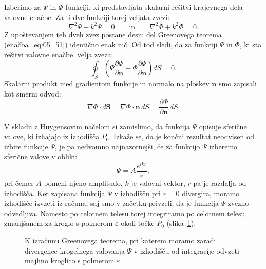 Izberimo za $\Psi$ in $\Phi$ funkciji, ki predstavljata skalarni rešitvi
krajevnega dela valovne enačbe. Za ti dve funkciji torej veljata zvezi:
\begin{equation}
\nabla^2 \Psi + k^2 \Psi = 0 \qquad \mathrm{in} \qquad \nabla^2 \Phi + k^2 \Phi = 0.
\label{eq:05_52}
\end{equation}
Z upoštevanjem teh dveh zvez postane desni del Greenovega teorema 
(enačba~\ref{eq:05_51}) identično enak nič. Od tod sledi, da za funkciji $\Psi$ in $\Phi$,
ki sta rešitvi valovne enačbe, velja zveza:
\begin{equation}
\oint_S \left( \Psi\frac{\partial \Phi}{\partial \mathbf{n}} -
\Phi\frac{\partial \Psi}{\partial \mathbf{n}} \right) dS = 0.
\label{eq:05_53}
\end{equation}
Skalarni produkt med gradientom funkcije in normalo na ploskev $\mathbf{n}$ smo
zapisali kot smerni odvod:
\begin{equation}
\nabla\Phi \cdot d\mathbf{S} = \nabla \Phi \cdot \mathbf{n}\,dS = 
\frac{\partial \Phi}{\partial \mathbf{n}}\,dS.
\label{eq:05_53a}
\end{equation}

V skladu z Huygensovim  načelom si zamislimo, da funkcija $\Psi$ opisuje sferične valove, ki
izhajajo iz izhodišča $P_0$. Izkaže se, da je končni rezultat neodvisen od izbire
funkcije $\Psi$, je pa nedvomno najnazornejši, če za funkcijo $\Psi$ 
izberemo sferične valove v obliki:
\begin{equation}
\Psi = A \frac{e^{ikr}}{r},
\label{eq:05_54}
\end{equation}
pri čemer $A$ pomeni njeno amplitudo, $k$ je valovni vektor, $r$ pa je 
razdalja od izhodišča. Ker zapisana funkcija $\Psi$ 
v izhodišču pri $r=0$ divergira, moramo izhodišče
izvzeti iz računa, saj smo v začetku privzeli, da je funkcija $\Psi$
zvezno odvedljiva. Namesto po celotnem telesu torej integriramo 
po celotnem telesu, zmanjšanem za kroglo s 
polmerom $\varepsilon$ okoli točke $P_0$ (slika~\ref{fig:05_Green}).
\begin{figure}[ht]
\centering
\def\svgwidth{70truemm} 

\caption{K izračunu Greenovega teorema, pri katerem moramo zaradi divergence krogelnega
valovanja $\Psi$ v izhodišču od integracije odvzeti majhno kroglico s polmerom $\varepsilon$.}
\label{fig:05_Green}
\end{figure}

